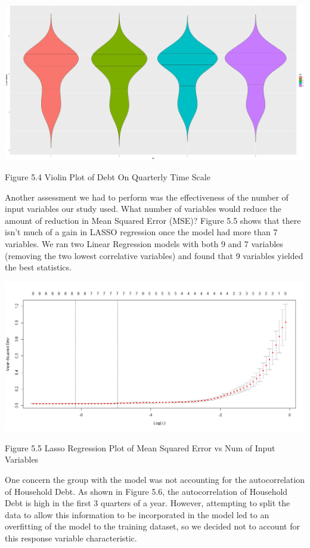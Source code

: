 \documentclass[sigconf,nonacm,11pt]{acmart}
\begin{document}
 
\vspace{0.5em}
\includegraphics[scale = 0.13]{QtrVSHouseholdDebt_violinPlot.png}

Figure 5.4 Violin Plot of Debt On Quarterly Time Scale
\vspace{0.75em}

Another assessment we had to perform was the effectiveness of the number of input variables our study used. What number of variables would reduce the amount of reduction in Mean Squared Error (MSE)?  Figure 5.5 shows that there isn't much of a gain in LASSO regression once the model had more than 7 variables.  We ran two Linear Regression models with both 9 and 7 variables (removing the two lowest correlative variables) and found that 9 variables yielded the best statistics.


\vspace{0.5em}
\includegraphics[scale = 0.18]{LASSORegression_Plot.png}

Figure 5.5 Lasso Regression Plot of Mean Squared Error vs Num of Input Variables
\vspace{0.75em}

One concern the group with the model was not accounting for the autocorrelation of Household Debt.  As shown in Figure 5.6, the autocorrelation of Household Debt is high in the first 3 quarters of a year.  However, attempting to split the data to allow this information to be incorporated in the model led to an overfitting of the model to the training dataset, so we decided not to account for this response variable characteristic.
\end{document}
